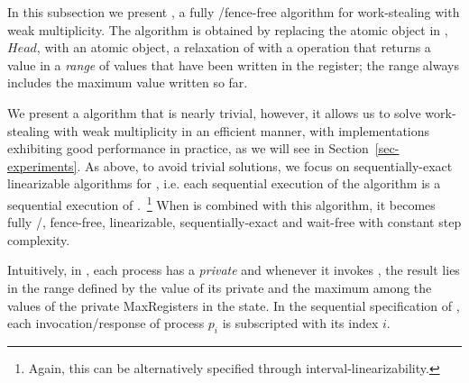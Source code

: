 In this subsection we present \NCWSM, a fully \R/\W fence-free algorithm for work-stealing with weak multiplicity.  The algorithm is obtained by replacing the atomic \MaxReg object in \WFWSM, $Head$, with an atomic \RangeMaxReg object, a relaxation of \MaxReg with a \RMaxR operation that returns a value in a \emph{range} of values that have been written in the register; the range always includes the maximum value written so far.

We present a \RangeMaxReg algorithm that is nearly trivial, however, it allows us to solve work-stealing with weak multiplicity in an efficient manner, with implementations exhibiting good performance in practice, as we will see in Section~\ref{sec-experiments}.  As above, to avoid trivial solutions, we focus on sequentially-exact linearizable algorithms for \RangeMaxReg, i.e. each sequential execution of the algorithm is a sequential execution of \MaxReg.~\footnote{Again, this can be alternatively specified through interval-linearizability.}  When \NCWSM is combined with this algorithm, it becomes fully \R/\W, fence-free, linearizable, sequentially-exact and wait-free with constant step complexity.

Intuitively, in \RangeMaxReg, each process has a \emph{private} \MaxReg and whenever it invokes \RMaxR, the result lies in the range defined by the value of its private \MaxReg and the maximum among the values of the private {\sf MaxRegisters} in the state.  In the sequential specification of \RangeMaxReg, each invocation/response of process $p_i$ is subscripted with its index $i$.




